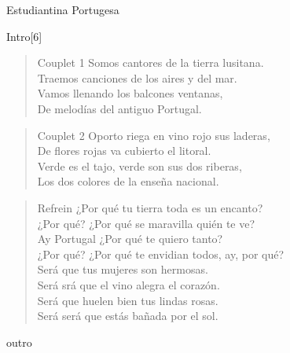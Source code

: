\begin{song}{Estudiantina Portugesa}

\begin{instrumental}{Intro}[6]
 \measure{} \measure{} \measure{} \measure{} \measure{} \measure{} \measure{}
\measure{} \measure{} \measure{} \measure{}  \measure{}  \measure{} \measure{} \measure{} \measure{} \measure{} \measure{} \measure{} \measure{} \measure{} \measure{} \measure{} \measure{}
\measure{} \measure{}  
\end{instrumental}

\begin{verse}{Couplet 1}
Somos cantores de la tierra lusitana.\\
Traemos canciones de los aires y del mar.\\ 
Vamos llenando los balcones ventanas,\\ 
De melodías del antiguo Portugal.\\ 
\end{verse}

\begin{verse}{Couplet 2}
Oporto riega en vino rojo sus laderas,\\ 
De flores rojas va cubierto el litoral.\\ 
Verde es el tajo, verde son sus dos riberas,\\ 
Los dos colores de la enseña nacional. \\
\end{verse} 

\begin{verse}{Refrein} 
¿Por qué tu tierra toda es un encanto?\\ 
¿Por qué? ¿Por qué se maravilla quién te ve?\\ 
\chord{}Ay Portugal ¿Por qué te quiero tanto?\\
¿Por qué? ¿Por qué te envidian todos, ay, por qué? \\

Será que tus mujeres son hermosas. \\
Será srá que el vino alegra el corazón.\\ 
\chord{}Será que huelen bien tus lindas rosas. \\
Será será que estás bañada por el sol. \\
\end{verse}


\begin{instrumental}{outro}
\measure{}  \measure{}  \measure{}  \measure{}  
\end{instrumental}
\end{song}

